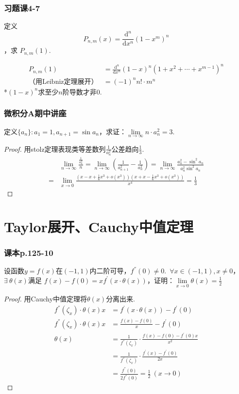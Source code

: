 \documentclass[./main.tex]{subfiles}
\begin{document}
\subsubsection{习题课4-7}
定义
$$P_{n,m}(x)=\frac{\text{d} ^n}{\text{d} x^n}(1-x^m)^n$$
，求 $P_{n,m}(1)$.\\
\begin{solution}
\begin{align*}
  P_{n,m}(1)&=\frac{\text{d} ^n}{\text{d} x^n}(1-x)^n(1+x^2+\cdots+x^{m-1})^n\\
            \text{（用Leibniz定理展开）}&=(-1)^nn!\cdot m^n 
\end{align*}
*$(1-x)^n$求至少$n$阶导数才非0.
\end{solution}

\subsubsection{微积分A期中讲座}
\noindent 定义$\{a_n\}:a_1=1,a_{n+1}=\sin a_n$，求证：$\lim\limits_{n\rightarrow \infty}n\cdot a_n^2=3$.
\begin{proof}
  用stolz定理表现类等差数列$\frac{1}{a_n^2}$公差趋向$\frac{1}{3}$.
  \begin{align*}
    &\lim\limits_{n\rightarrow \infty}\frac{\frac{1}{a_n^2}}{n}=\lim\limits_{n\rightarrow \infty}(\frac{1}{a_{n+1}^2}-\frac{1}{a_n^2})=\lim\limits_{n\rightarrow \infty}\frac{a_n^2-\sin^2a_n}{a_n^2\sin^2a_n} \\
    =&\lim\limits_{x\rightarrow 0}\frac{(x-x+\frac{1}{6}x^3+o(x^3))(x+x-\frac{1}{6}x^3+o(x^3))}{x^4}=\frac{1}{3}
  \end{align*}
\end{proof}

\section{Taylor展开、Cauchy中值定理}
\subsubsection{课本p.125-10}
\noindent 设函数$y=f(x)$在$(-1,1)$内二阶可导，$f^{''}(0)\neq 0$.\ $\forall x\in (-1,1),x\neq 0$，$\exists\ \theta(x)$满足
$f(x)-f(0)=xf^{'}(x\cdot\theta(x))$，证明：$\lim\limits_{x\rightarrow 0}\theta(x)=\frac{1}{2}$
\begin{proof}
  用Cauchy中值定理将$\theta(x)$分离出来.
  \begin{align*}
    f^{''}(\zeta_x)\cdot\theta(x)x&=f^{'}(x\cdot\theta(x))-f^{'}(0)\\
    f^{''}(\zeta_x)\cdot\theta(x)x&=\frac{f(x)-f(0)}{x}-f^{'}(0)\\
    \theta(x)&=\frac{1}{f^{''}(\zeta_x)}\cdot \frac{f(x)-f(0)-f^{'}(0)x}{x^2}\\
    &=\frac{1}{f^{''}(\zeta_x)}\cdot \frac{f^{'}(x)-f^{'}(0)}{2x}\\
    &=\frac{f^{''}(0)}{2f^{''}(0)}=\frac{1}{2} \ (x\rightarrow 0)
  \end{align*}
\end{proof}
\end{document}
